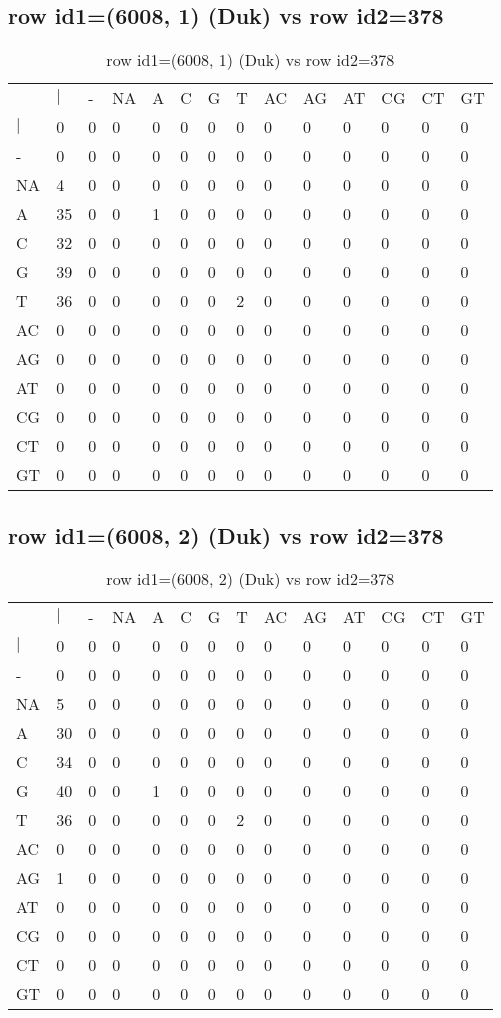 \subsection{row id1=(6008, 1) (Duk) vs row id2=378}
\begin{center}
\begin{longtable}{|l|l|l|l|l|l|l|l|l|l|l|l|l|l|}
\caption{row id1=(6008, 1) (Duk) vs row id2=378} \label{table_dm6}\\
\hline
\\
\hline
&$|$&-&NA&A&C&G&T&AC&AG&AT&CG&CT&GT\\
$|$&0&0&0&0&0&0&0&0&0&0&0&0&0\\
-&0&0&0&0&0&0&0&0&0&0&0&0&0\\
NA&4&0&0&0&0&0&0&0&0&0&0&0&0\\
A&35&0&0&1&0&0&0&0&0&0&0&0&0\\
C&32&0&0&0&0&0&0&0&0&0&0&0&0\\
G&39&0&0&0&0&0&0&0&0&0&0&0&0\\
T&36&0&0&0&0&0&2&0&0&0&0&0&0\\
AC&0&0&0&0&0&0&0&0&0&0&0&0&0\\
AG&0&0&0&0&0&0&0&0&0&0&0&0&0\\
AT&0&0&0&0&0&0&0&0&0&0&0&0&0\\
CG&0&0&0&0&0&0&0&0&0&0&0&0&0\\
CT&0&0&0&0&0&0&0&0&0&0&0&0&0\\
GT&0&0&0&0&0&0&0&0&0&0&0&0&0\\
\hline
\end{longtable}
\end{center}

\subsection{row id1=(6008, 2) (Duk) vs row id2=378}
\begin{center}
\begin{longtable}{|l|l|l|l|l|l|l|l|l|l|l|l|l|l|}
\caption{row id1=(6008, 2) (Duk) vs row id2=378} \label{table_dm8}\\
\hline
\\
\hline
&$|$&-&NA&A&C&G&T&AC&AG&AT&CG&CT&GT\\
$|$&0&0&0&0&0&0&0&0&0&0&0&0&0\\
-&0&0&0&0&0&0&0&0&0&0&0&0&0\\
NA&5&0&0&0&0&0&0&0&0&0&0&0&0\\
A&30&0&0&0&0&0&0&0&0&0&0&0&0\\
C&34&0&0&0&0&0&0&0&0&0&0&0&0\\
G&40&0&0&1&0&0&0&0&0&0&0&0&0\\
T&36&0&0&0&0&0&2&0&0&0&0&0&0\\
AC&0&0&0&0&0&0&0&0&0&0&0&0&0\\
AG&1&0&0&0&0&0&0&0&0&0&0&0&0\\
AT&0&0&0&0&0&0&0&0&0&0&0&0&0\\
CG&0&0&0&0&0&0&0&0&0&0&0&0&0\\
CT&0&0&0&0&0&0&0&0&0&0&0&0&0\\
GT&0&0&0&0&0&0&0&0&0&0&0&0&0\\
\hline
\end{longtable}
\end{center}

